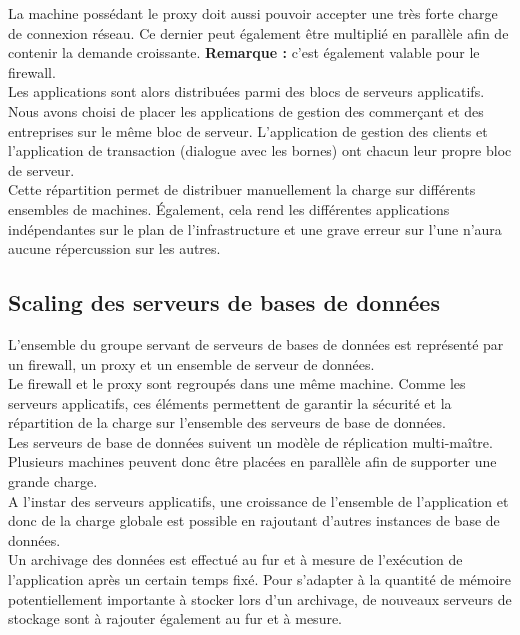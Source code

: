 La machine possédant le proxy doit aussi pouvoir accepter une très forte charge
de connexion réseau. Ce dernier peut également être multiplié en parallèle afin
de contenir la demande croissante. \textbf{Remarque :} c'est également valable
pour le firewall. \\

Les applications sont alors distribuées parmi des blocs de serveurs
applicatifs. Nous avons choisi de placer les applications de gestion des
commerçant et des entreprises sur le même bloc de serveur. L'application de
gestion des clients et l'application de transaction (dialogue avec les bornes)
ont chacun leur propre bloc de serveur. \\

Cette répartition permet de distribuer manuellement la charge sur différents
ensembles de machines. Également, cela rend les différentes applications
indépendantes sur le plan de l'infrastructure et une grave erreur sur l'une
n'aura aucune répercussion sur les autres. \\

\subsection{Scaling des serveurs de bases de données}
\label{subsec:scaling-bdd}

L'ensemble du groupe servant de serveurs de bases de données est représenté par
un firewall, un proxy et un ensemble de serveur de données. \\

Le firewall et le proxy sont regroupés dans une même machine. Comme les
serveurs applicatifs, ces éléments permettent de garantir la sécurité et la
répartition de la charge sur l'ensemble des serveurs de base de données. \\

Les serveurs de base de données suivent un modèle de réplication multi-maître.
Plusieurs machines peuvent donc être placées en parallèle afin de supporter une
grande charge. \\

A l'instar des serveurs applicatifs, une croissance de l'ensemble de
l'application et donc de la charge globale est possible en rajoutant d'autres
instances de base de données. \\

Un archivage des données est effectué au fur et à mesure de l'exécution de
l'application après un certain temps fixé. Pour s'adapter à la quantité de
mémoire potentiellement importante à stocker lors d'un archivage, de nouveaux
serveurs de stockage sont à rajouter également au fur et à mesure. \\

